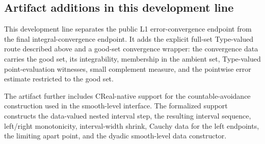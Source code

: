 \documentclass[11pt]{article}
\theoremstyle{definition}
\theoremstyle{remark}
\begin{document}
\subsection{Artifact additions in this development line}
\label{sec:additions}
This development line separates the public L1 error-convergence endpoint from the final integral-convergence endpoint.  It adds the explicit full-set Type-valued route described above and a good-set convergence wrapper: the convergence data carries the good set, its integrability, membership in the ambient set, Type-valued point-evaluation witnesses, small complement measure, and the pointwise error estimate restricted to the good set.

The artifact further includes CReal-native support for the countable-avoidance construction used in the smooth-level interface.  The formalized support constructs the data-valued nested interval step, the resulting interval sequence, left/right monotonicity, interval-width shrink, Cauchy data for the left endpoints, the limiting apart point, and the dyadic smooth-level data constructor.
\end{document}
